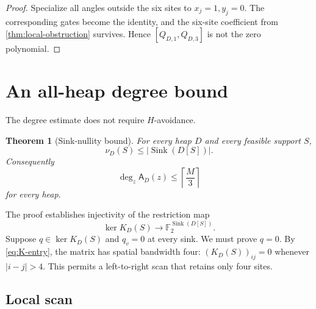 \documentclass[10pt,letterpaper]{article}
\newtheorem{theorem}{Theorem}
\newcommand{\FF}{\mathbb F_2}
\newcommand{\Sink}{\operatorname{Sink}}
\newcommand{\cA}{\mathsf A}
\begin{document}
\begin{proof}
Specialize all angles outside the six sites to \(x_j=1,y_j=0\).  The corresponding gates become the identity, and the six-site coefficient from \cref{thm:local-obstruction} survives.  Hence \([Q_{D,1},Q_{D,3}]\) is not the zero polynomial.
\end{proof}

\section{An all-heap degree bound}\label{sec:degree}

The degree estimate does not require \(H\)-avoidance.

\begin{theorem}[Sink-nullity bound]\label{thm:sink-bound}
For every heap \(D\) and every feasible support \(S\),
\begin{equation}\label{eq:sink-bound}
 \nu_D(S)\le |\Sink(D[S])|.
\end{equation}
Consequently
\begin{equation}\label{eq:degree-all}
 \deg_z\cA_D(z)\le\left\lceil\frac M3\right\rceil
\end{equation}
for every heap.
\end{theorem}

The proof establishes injectivity of the restriction map
\begin{equation}\label{eq:sink-restriction}
 \ker K_D(S)\longrightarrow\FF^{\Sink(D[S])}.
\end{equation}
Suppose \(q\in\ker K_D(S)\) and \(q_v=0\) at every sink.  We must prove \(q=0\).  By \eqref{eq:K-entry}, the matrix has spatial bandwidth four: \((K_D(S))_{ij}=0\) whenever \(|i-j|>4\).  This permits a left-to-right scan that retains only four sites.

\subsection{Local scan}
\end{document}
